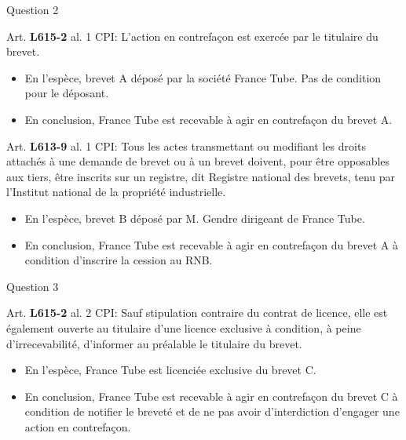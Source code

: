 \begin{frame}{Question 2}

\begin{block}{}
Art. \textbf{L615-2} al. 1 CPI: L'action en contrefaçon est exercée par le titulaire du brevet.
\end{block}

\begin{itemize}
    \item En l'espèce, brevet A déposé par la société France Tube.
    Pas de condition pour le déposant.
    \item En conclusion, France Tube est recevable à agir en contrefaçon du brevet A.
\end{itemize}

\begin{block}{}
Art. \textbf{L613-9} al. 1 CPI: Tous les actes transmettant ou modifiant 
les droits attachés à une demande de brevet ou à un brevet doivent, 
pour être opposables aux tiers, être inscrits sur un registre, 
dit Registre national des brevets, tenu par l'Institut national de la propriété industrielle.
\end{block}

\begin{itemize}
    \item En l'espèce, brevet B déposé par M. Gendre dirigeant de France Tube.
    \item En conclusion, France Tube est recevable à agir en contrefaçon du brevet A à
    condition d'inscrire la cession au RNB.
\end{itemize}

\end{frame}

\begin{frame}{Question 3}

\begin{block}{}
Art. \textbf{L615-2} al. 2 CPI: Sauf stipulation contraire du contrat de licence,
elle est également ouverte au titulaire d'une licence exclusive à condition,
à peine d'irrecevabilité, d'informer au préalable le titulaire du brevet.

\end{block}

\begin{itemize}
    \item En l'espèce, France Tube est licenciée exclusive du brevet C.
    \item En conclusion, France Tube est recevable à agir en contrefaçon du brevet C à
    condition de notifier le breveté et de ne pas avoir d'interdiction d'engager
    une action en contrefaçon.
\end{itemize}

\end{frame}

